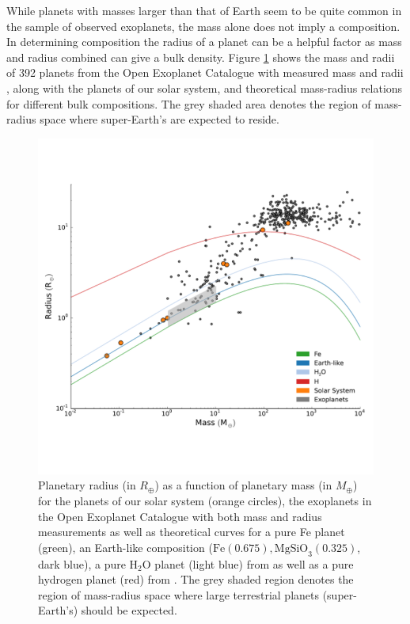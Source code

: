 While planets with masses larger than that of Earth seem to be quite common in the sample of observed exoplanets, the mass alone does not imply a composition. In determining composition the radius of a planet can be a helpful factor as mass and radius combined can give a bulk density. Figure \ref{fig:exoplanetmassradii} shows the mass and radii of 392 planets from the Open Exoplanet Catalogue with measured mass and radii \citep{rein2015}, along with the planets of our solar system, and theoretical mass-radius relations for different bulk compositions. The grey shaded area denotes the region of mass-radius space where super-Earth's are expected to reside.
\begin{figure}
	\centering
        \includegraphics[width=\textwidth]{Chapter3/Figures/ExoplanetsMassRadius.pdf}
        \caption{Planetary radius (in $R_\oplus$) as a function of planetary mass (in $M_\oplus$) for the planets of our solar system (orange circles), the exoplanets in the Open Exoplanet Catalogue with both mass and radius measurements \citep{rein2015} as well as theoretical curves for a pure Fe planet (green), an Earth-like composition ($\textrm{Fe}\left(0.675\right), \textrm{MgSiO}_3(0.325)$, dark blue), a pure $\textrm{H}_{2}\textrm{O}$ planet (light blue) from \citet{seager2007} as well as a pure hydrogen planet (red) from  \citet{zapolsky1969}. The grey shaded region denotes the region of mass-radius space where large terrestrial planets (super-Earth's) should be expected. }
        \label{fig:exoplanetmassradii}
\end{figure}

